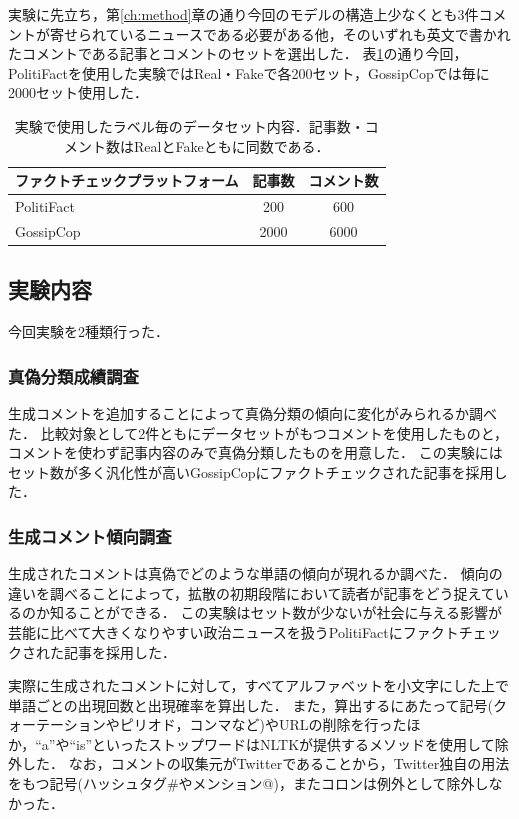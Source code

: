 実験に先立ち，第\ref{ch:method}章の通り今回のモデルの構造上少なくとも3件コメントが寄せられているニュースである必要がある他，そのいずれも英文で書かれたコメントである記事とコメントのセットを選出した．
表\ref{tbl:dataset}の通り今回，PolitiFactを使用した実験ではReal・Fakeで各200セット，GossipCopでは毎に2000セット使用した．

\begin{table}[p]
    \caption{実験で使用したラベル毎のデータセット内容．記事数・コメント数はRealとFakeともに同数である．}
    \label{tbl:dataset}
    \centering
    \begin{tabular}{lcc}
        \hline
        ファクトチェックプラットフォーム     & 記事数 & コメント数 \\ \hline
        PolitiFact & 200   & 600   \\
        GossipCop  & 2000  & 6000  \\ \hline
    \end{tabular}
\end{table}

\subsection{実験内容}
\label{sec:exp_contents}
今回実験を2種類行った．

\subsubsection{真偽分類成績調査}
生成コメントを追加することによって真偽分類の傾向に変化がみられるか調べた．
比較対象として2件ともにデータセットがもつコメントを使用したものと，コメントを使わず記事内容のみで真偽分類したものを用意した．
この実験にはセット数が多く汎化性が高いGossipCopにファクトチェックされた記事を採用した．

\subsubsection{生成コメント傾向調査}
生成されたコメントは真偽でどのような単語の傾向が現れるか調べた．
傾向の違いを調べることによって，拡散の初期段階において読者が記事をどう捉えているのか知ることができる．
この実験はセット数が少ないが社会に与える影響が芸能に比べて大きくなりやすい政治ニュースを扱うPolitiFactにファクトチェックされた記事を採用した．

実際に生成されたコメントに対して，すべてアルファベットを小文字にした上で単語ごとの出現回数と出現確率を算出した．
また，算出するにあたって記号(クォーテーションやピリオド，コンマなど)やURLの削除を行ったほか，``a''や``is''といったストップワードはNLTK\cite{bird-loper-2004-nltk}が提供するメソッドを使用して除外した．
なお，コメントの収集元がTwitterであることから，Twitter独自の用法をもつ記号(ハッシュタグ\#やメンション@)，またコロンは例外として除外しなかった．

